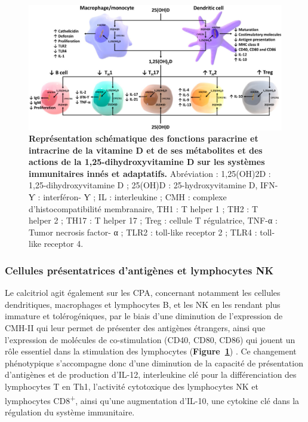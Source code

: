 \documentclass[
  a4paper,
  DIV=11,
  numbers=noendperiod,
  listof=totoc]{scrreprt}
\begin{document}
\begin{figure}

{\centering \includegraphics{figures/vd-action.jpg}

}

\caption[\textbf{Représentation schématique des fonctions paracrine et
intracrine de la vitamine D et de ses métabolites et des actions de la
1,25-dihydroxyvitamine D sur les systèmes immunitaires innés et
adaptatifs.}]{\label{fig-vd-action}\textbf{Représentation schématique
des fonctions paracrine et intracrine de la vitamine D et de ses
métabolites et des actions de la 1,25-dihydroxyvitamine D sur les
systèmes immunitaires innés et adaptatifs.} Abréviation : 1,25(OH)2D :
1,25-dihydroxyvitamine D ; 25(OH)D : 25-hydroxyvitamine D, IFN-Ƴ :
interféron- Ƴ ; IL : interleukine ; CMH : complexe d'histocompatibilité
membranaire, TH1 : T helper 1 ; TH2 : T helper 2 ; TH17 : T helper 17 ;
Treg : cellule T régulatrice, TNF-α : Tumor necrosis factor- α ; TLR2 :
toll-like receptor 2 ; TLR4 : toll-like receptor 4.
\autocite{Charoenngam.2020}}

\end{figure}

\hypertarget{cellules-pruxe9sentatrices-dantiguxe8nes-et-lymphocytes-nk}{%
\subsubsection{Cellules présentatrices d'antigènes et lymphocytes
NK}\label{cellules-pruxe9sentatrices-dantiguxe8nes-et-lymphocytes-nk}}

Le calcitriol agit également sur les \ac{CPA}, concernant notamment les
cellules dendritiques, macrophages et lymphocytes B, et les \ac{NK} en
les rendant plus immature et tolérogéniques, par le biais d'une
diminution de l'expression de \ac{CMH-II} qui leur permet de présenter
des antigènes étrangers, ainsi que l'expression de molécules de
co-stimulation (CD40, CD80, CD86) qui jouent un rôle essentiel dans la
stimulation des lymphocytes (\textbf{Figure~\ref{fig-vd-action}})
\autocite{Charoenngam.2020,Meza-Meza.2022,Caprio.2017}. Ce changement
phénotypique s'accompagne donc d'une diminution de la capacité de
présentation d'antigènes et de production d'\ac{IL-12}, interleukine clé
pour la différenciation des lymphocytes T en Th1, l'activité cytotoxique
des lymphocytes \ac{NK} et lymphocytes CD8\textsuperscript{+}, ainsi
qu'une augmentation d'\ac{IL-10}, une cytokine clé dans la régulation du
système immunitaire.
\end{document}
